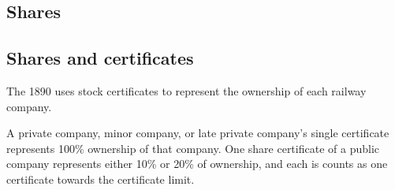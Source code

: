 \documentclass{article}
\begin{document}
\begin{CJK}{UTF8}{min}
\section{Shares}

\subsection{Shares and certificates}
The 1890 uses stock certificates to represent the ownership of each railway
company.

A private company, minor company, or late private company's single
certificate represents 100\% ownership of that company. One share
certificate of a public company represents either  10\% or 20\% of ownership, and
each is counts as one certificate towards the certificate limit.


\end{CJK}
\end{document}
